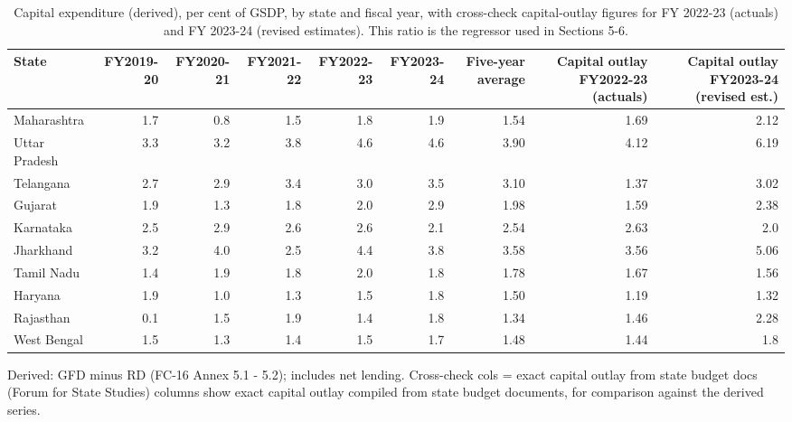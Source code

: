 \documentclass[12pt,a4paper]{article}
\begin{document}
\begin{table}[H]
\centering
\caption{Capital expenditure (derived), per cent of GSDP, by state and fiscal year, with cross-check capital-outlay figures for FY 2022-23 (actuals) and FY 2023-24 (revised estimates). This ratio is the regressor used in Sections 5-6.}
\label{tab:8}
\footnotesize
\begin{adjustbox}{max width=\textwidth}
\begin{tabular}{@{}lrrrrrrrr@{}}
\toprule
State & FY2019-20 & FY2020-21 & FY2021-22 & FY2022-23 & FY2023-24 & Five-year average & Capital outlay FY2022-23 (actuals) & Capital outlay FY2023-24 (revised est.) \\
\midrule
Maharashtra & 1.7 & 0.8 & 1.5 & 1.8 & 1.9 & 1.54 & 1.69 & 2.12 \\
Uttar Pradesh & 3.3 & 3.2 & 3.8 & 4.6 & 4.6 & 3.90 & 4.12 & 6.19 \\
Telangana & 2.7 & 2.9 & 3.4 & 3.0 & 3.5 & 3.10 & 1.37 & 3.02 \\
Gujarat & 1.9 & 1.3 & 1.8 & 2.0 & 2.9 & 1.98 & 1.59 & 2.38 \\
Karnataka & 2.5 & 2.9 & 2.6 & 2.6 & 2.1 & 2.54 & 2.63 & 2.0 \\
Jharkhand & 3.2 & 4.0 & 2.5 & 4.4 & 3.8 & 3.58 & 3.56 & 5.06 \\
Tamil Nadu & 1.4 & 1.9 & 1.8 & 2.0 & 1.8 & 1.78 & 1.67 & 1.56 \\
Haryana & 1.9 & 1.0 & 1.3 & 1.5 & 1.8 & 1.50 & 1.19 & 1.32 \\
Rajasthan & 0.1 & 1.5 & 1.9 & 1.4 & 1.8 & 1.34 & 1.46 & 2.28 \\
West Bengal & 1.5 & 1.3 & 1.4 & 1.5 & 1.7 & 1.48 & 1.44 & 1.8 \\
\bottomrule
\end{tabular}
\end{adjustbox}
\end{table}

Derived: GFD minus RD (FC-16 Annex 5.1 - 5.2); includes net lending. Cross-check cols = exact capital outlay from state budget docs (Forum for State Studies) columns show exact capital outlay compiled from state budget documents, for comparison against the derived series.
\end{document}
